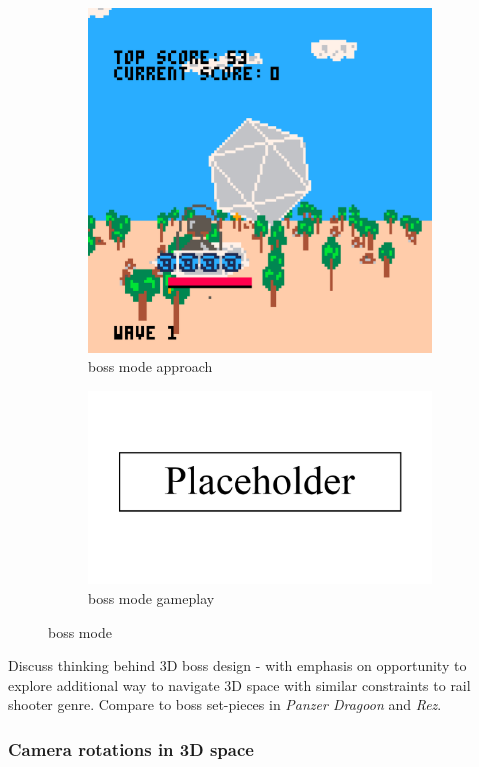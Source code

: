 \documentclass{article}
\begin{document}
\begin{figure}[h]
\begin{subfigure}{.5\textwidth}
  \centering
  \includegraphics[width=.8\linewidth]{boss1}
  \caption{boss mode approach}
  \label{fig:bossfig1}
\end{subfigure}\hfill
\begin{subfigure}{.5\textwidth}
  \centering
  \includegraphics[width=.8\linewidth]{placeholder}
  \caption{boss mode gameplay}
  \label{fig:bossfig2}
\end{subfigure}\hfill
\caption{boss mode}
\label{fig:boss}
\end{figure}

Discuss thinking behind 3D boss design - with emphasis on opportunity to explore additional way to
navigate 3D space with similar constraints to rail shooter genre. Compare to boss set-pieces in
\textit{Panzer Dragoon} and \textit{Rez}.

\subsubsection*{Camera rotations in 3D space}
\end{document}
